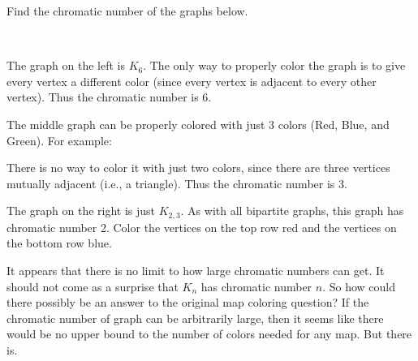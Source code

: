 \documentclass[12pt]{article}
\begin{document}
\begin{example}
  Find the chromatic number of the graphs below.
  \begin{center}
    \hfill
    \hfill
    \hfill
  \hfill ~
  \end{center}

\begin{solution}
  The graph on the left is $K_6$.  The only way to properly color the graph is to give every vertex a different color (since every vertex is adjacent to every other vertex).  Thus the chromatic number is 6.
  
  The middle graph can be properly colored with just 3 colors (Red, Blue, and Green).  For example:
  
  \begin{center}
  \end{center}
  
  There is no way to color it with just two colors, since there are three vertices mutually adjacent (i.e., a triangle).  Thus the chromatic number is 3.
  
  The graph on the right is just $K_{2,3}$.  As with all bipartite graphs, this graph has chromatic number 2.   Color the vertices on the top row red and the vertices on the bottom row blue.
\end{solution}

\end{example}

It appears that there is no limit to how large chromatic numbers can get.  It should not come as a surprise that $K_n$ has chromatic number $n$.  So how could there possibly be an answer to the original map coloring question?  If the chromatic number of graph can be arbitrarily large, then it seems like there would be no upper bound to the number of colors needed for any map.  But there is.
\end{document}
